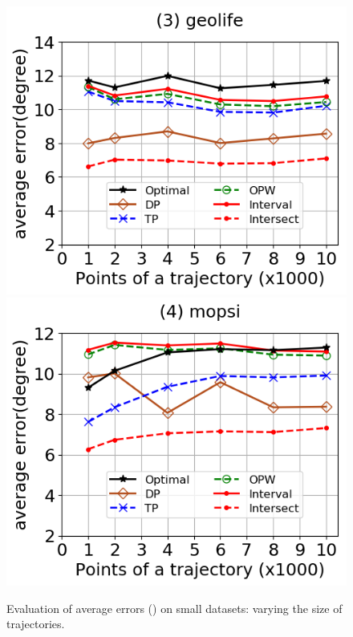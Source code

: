 \begin{figure}[tb!]
	\includegraphics[scale=0.315]{Figures/Exp-DAD-error-size-geolife.png}	\hspace{1ex}
	\includegraphics[scale=0.315]{Figures/Exp-DAD-error-size-mopsi.png}	
	\vspace{-3ex}
	\caption{\small Evaluation of average errors (\dad) on small datasets: varying the size of trajectories.}
	\label{fig:ae-dad-ped-size}
	\vspace{-2ex}
\end{figure}


